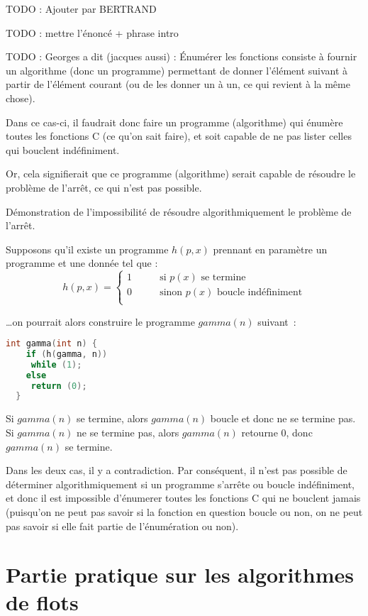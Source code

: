 \documentclass{article}
\begin{document}
TODO : Ajouter par BERTRAND

TODO : mettre l'énoncé + phrase intro

TODO : Georges a dit (jacques aussi) : Énumérer les fonctions consiste à fournir un algorithme (donc un programme) permettant de donner l'élément suivant à partir de l'élément courant (ou de les donner un à un, ce qui revient à la même chose).

Dans ce cas-ci, il faudrait donc faire un programme (algorithme) qui énumère toutes les fonctions C (ce qu'on sait faire), et soit capable de ne pas lister celles qui bouclent indéfiniment.

Or, cela signifierait que ce programme (algorithme) serait capable de résoudre le problème de l'arrêt, ce qui n'est pas possible.

Démonstration de l'impossibilité de résoudre algorithmiquement le problème de l'arrêt.

Supposons qu'il existe un programme $h(p, x)$ prennant en paramètre un programme et une donnée tel que :
\[
h(p, x) = \left\{
\begin{array}{ll}
  1 & \qquad \text{si $p(x)$ se termine} \\
  0 & \qquad \text{sinon $p(x)$ boucle indéfiniment} \\
\end{array}
\right.
\]

\ldots on pourrait alors construire le programme $gamma(n)$ suivant~:
\begin{lstlisting}[language=C]
  int gamma(int n) {
    if (h(gamma, n))
     while (1);
    else
     return (0);
  }
\end{lstlisting}
Si $gamma(n)$ se termine, alors $gamma(n)$ boucle et donc ne se termine pas. Si $gamma(n)$ ne se termine pas, alors $gamma(n)$ retourne 0,
donc $gamma(n)$ se termine.

Dans les deux cas, il y a contradiction. Par conséquent, il n'est pas possible de déterminer algorithmiquement si un programme s'arrête ou
boucle indéfiniment, et donc il est impossible d'énumerer toutes les fonctions C qui ne bouclent jamais (puisqu'on ne peut pas savoir si la
fonction en question boucle ou non, on ne peut pas savoir si elle fait partie de l'énumération ou non).

\section{Partie pratique sur les algorithmes de flots}
\end{document}
